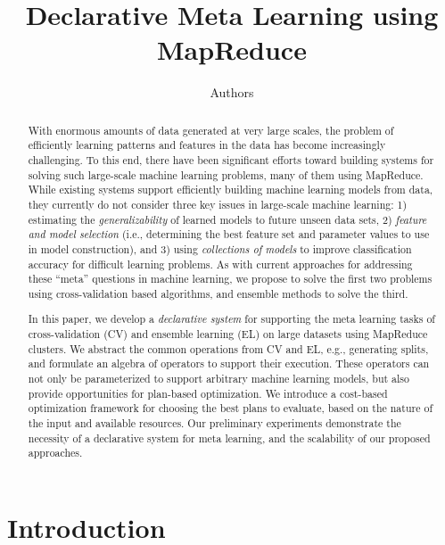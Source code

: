 \documentclass{vldb}
\author{
    Authors
}
\title{Declarative Meta Learning using MapReduce}
\begin{document}
\maketitle

\begin{abstract}
With enormous amounts of data generated at very large scales, the problem of efficiently learning
patterns and features in the data has become increasingly challenging.  To this end, there have been
significant efforts toward building systems for solving such large-scale machine learning problems,
many of them using MapReduce.  While existing systems support efficiently building machine learning
models from data, they currently do not consider three key issues in large-scale machine learning:
1) estimating the {\em generalizability} of learned models to future unseen data sets, 2) {\em
  feature and model selection} (i.e., determining the best feature set and parameter values to use
in model construction), and 3) using {\em collections of models} to improve classification accuracy
for difficult learning problems.  As with current approaches for addressing these ``meta'' questions
in machine learning, we propose to solve the first two problems using cross-validation based
algorithms, and ensemble methods to solve the third.

In this paper, we develop a {\em declarative system} for supporting the meta learning tasks of
cross-validation (CV) and ensemble learning (EL) on large datasets using MapReduce clusters.  We
abstract the common operations from CV and EL, e.g., generating splits, and formulate an algebra of
operators to support their execution. These operators can not only be parameterized to support
arbitrary machine learning models, but also provide opportunities for plan-based optimization. We
introduce a cost-based optimization framework for choosing the best plans to evaluate, based on the
nature of the input and available resources. Our preliminary experiments demonstrate the necessity
of a declarative system for meta learning, and the scalability of our proposed approaches.
\end{abstract}

\section{Introduction}
\label{sec:introduction}
\end{document}
